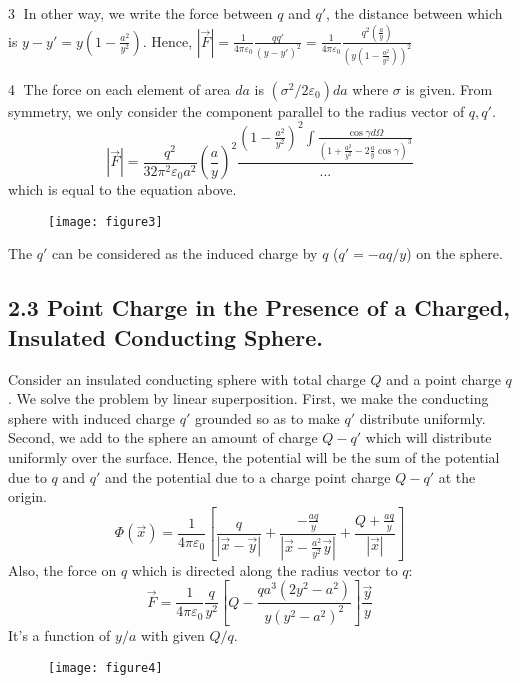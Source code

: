 \documentclass{article}
\begin{document}
	\textcircled{3} In other way, we write the force between $q$ and $q'$, the distance between which is $y-y' = y(1 - \frac{a^2}{y^2})$.
	Hence, $|\vec{F}| = \frac{1}{4\pi\varepsilon_0} \frac{qq'}{(y-y')^2} = \frac{1}{4\pi\varepsilon_0} \frac{q^2(\frac{a}{y})}{(y(1-\frac{a^2}{y^2}))^2}$
	
	\textcircled{4} The force on each element of area $da$ is $(\sigma^2/2\varepsilon_0)da$ where $\sigma$ is given.
	From symmetry, we only consider the component parallel to the radius vector of $q,q'$.
	$$ |\vec{F}| = \frac{q^2}{32\pi^2\varepsilon_0 a^2} \left(\frac{a}{y}\right)^2 \frac{(1-\frac{a^2}{y^2})^2 \int \frac{\cos\gamma d\Omega}{(1+\frac{a^2}{y^2} - 2\frac{a}{y}\cos\gamma)^3} }{...} $$
	which is equal to the equation above.
	
	\begin{figure}[h]
		\centering
		\texttt{[image: figure3]}
		\caption{}
		\label{fig:figure3}
	\end{figure}
	
	The $q'$ can be considered as the induced charge by $q$ ($q'=-aq/y$) on the sphere.
	
	\subsection*{2.3 Point Charge in the Presence of a Charged, Insulated Conducting Sphere.}
	Consider an insulated conducting sphere with total charge $Q$ and a point charge $q$. We solve the problem by linear superposition.
	First, we make the conducting sphere with induced charge $q'$ grounded so as to make $q'$ distribute uniformly.
	Second, we add to the sphere an amount of charge $Q-q'$ which will distribute uniformly over the surface.
	Hence, the potential will be the sum of the potential due to $q$ and $q'$ and the potential due to a charge point charge $Q-q'$ at the origin.
	$$ \Phi(\vec{x}) = \frac{1}{4\pi\varepsilon_0} \left[ \frac{q}{|\vec{x}-\vec{y}|} + \frac{-\frac{aq}{y}}{|\vec{x} - \frac{a^2}{y^2}\vec{y}|} + \frac{Q+\frac{aq}{y}}{|\vec{x}|} \right] $$
	Also, the force on $q$ which is directed along the radius vector to $q$:
	$$ \vec{F} = \frac{1}{4\pi\varepsilon_0} \frac{q}{y^2} \left[ Q - \frac{qa^3(2y^2-a^2)}{y(y^2-a^2)^2} \right] \frac{\vec{y}}{y} $$
	It's a function of $y/a$ with given $Q/q$.
	
	\begin{figure}[h]
		\centering
		\texttt{[image: figure4]}
		\caption{}
		\label{fig:figure4}
	\end{figure}
	
\end{document}
